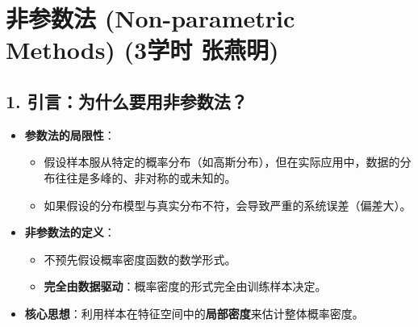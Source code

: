 \documentclass[a4paper, 11pt]{ctexart}
\begin{document}
\newpage
\section{非参数法 (Non-parametric Methods) \small{(3学时 张燕明)}}

\subsection{1. 引言：为什么要用非参数法？}
\begin{itemize}
    \item \textbf{参数法的局限性}：
    \begin{itemize}
        \item 假设样本服从特定的概率分布（如高斯分布），但在实际应用中，数据的分布往往是多峰的、非对称的或未知的。
        \item 如果假设的分布模型与真实分布不符，会导致严重的系统误差（偏差大）。
    \end{itemize}
    \item \textbf{非参数法的定义}：
    \begin{itemize}
        \item 不预先假设概率密度函数的数学形式。
        \item \textbf{完全由数据驱动}：概率密度的形式完全由训练样本决定。
    \end{itemize}
    \item \textbf{核心思想}：利用样本在特征空间中的\textbf{局部密度}来估计整体概率密度。
\end{itemize}
\end{document}
